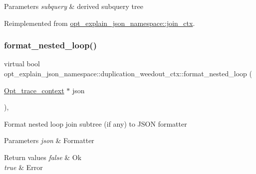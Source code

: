 \begin{DoxyParams}{Parameters}
{\em subquery} & derived subquery tree \\
\hline
\end{DoxyParams}


Reimplemented from \mbox{\hyperlink{classopt__explain__json__namespace_1_1join__ctx_aa37b36787c204c852a8d7578459cfbc0}{opt\+\_\+explain\+\_\+json\+\_\+namespace\+::join\+\_\+ctx}}.

\mbox{\label{classopt__explain__json__namespace_1_1duplication__weedout__ctx_af29378c61f70c4fc201f6b81d9f0129c}} 
\subsubsection{\texorpdfstring{format\+\_\+nested\+\_\+loop()}{format\_nested\_loop()}}
{\footnotesize\ttfamily virtual bool opt\+\_\+explain\+\_\+json\+\_\+namespace\+::duplication\+\_\+weedout\+\_\+ctx\+::format\+\_\+nested\+\_\+loop (\begin{DoxyParamCaption}\item[{\mbox{\hyperlink{classOpt__trace__context}{Opt\+\_\+trace\+\_\+context}} $\ast$}]{json }\end{DoxyParamCaption})\hspace{0.3cm}{\ttfamily [inline]}, {\ttfamily [virtual]}}

Format nested loop join subtree (if any) to J\+S\+ON formatter


\begin{DoxyParams}{Parameters}
{\em json} & Formatter\\
\hline
\end{DoxyParams}

\begin{DoxyRetVals}{Return values}
{\em false} & Ok \\
\hline
{\em true} & Error \\
\hline
\end{DoxyRetVals}


